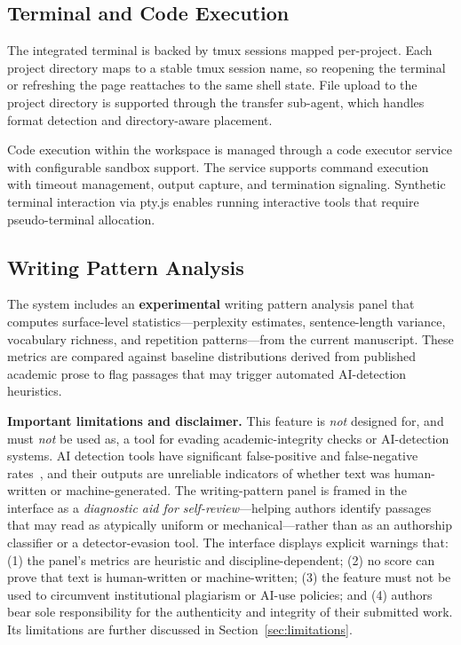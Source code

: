 \subsection{Terminal and Code Execution}

The integrated terminal is backed by tmux sessions mapped per-project. Each
project directory maps to a stable tmux session name, so reopening the terminal
or refreshing the page reattaches to the same shell state. File upload to the
project directory is supported through the transfer sub-agent, which handles
format detection and directory-aware placement.

Code execution within the workspace is managed through a code executor service
with configurable sandbox support. The service supports command execution with
timeout management, output capture, and termination signaling. Synthetic
terminal interaction via pty.js enables running interactive tools that require
pseudo-terminal allocation.

\subsection{Writing Pattern Analysis}

The system includes an \textbf{experimental} writing pattern analysis panel
that computes surface-level statistics---perplexity estimates, sentence-length
variance, vocabulary richness, and repetition patterns---from the current
manuscript. These metrics are compared against baseline distributions derived
from published academic prose to flag passages that may trigger automated
AI-detection heuristics.

\textbf{Important limitations and disclaimer.} This feature is \emph{not}
designed for, and must \emph{not} be used as, a tool for evading
academic-integrity checks or AI-detection systems. AI detection tools have
significant false-positive and false-negative rates~\cite{liang2024llmwriting},
and their outputs are unreliable indicators of whether text was human-written
or machine-generated. The writing-pattern panel is framed in the interface as a
\emph{diagnostic aid for self-review}---helping authors identify passages that
may read as atypically uniform or mechanical---rather than as an authorship
classifier or a detector-evasion tool. The interface displays explicit warnings
that: (1) the panel's metrics are heuristic and discipline-dependent; (2) no
score can prove that text is human-written or machine-written; (3) the feature
must not be used to circumvent institutional plagiarism or AI-use policies; and
(4) authors bear sole responsibility for the authenticity and integrity of
their submitted work. Its limitations are further discussed in
Section~\ref{sec:limitations}.

